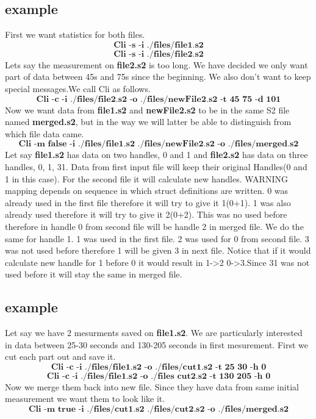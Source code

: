 \documentclass[english]{article}
\begin{document}
\subsection{example}
First we want statistics for both files. $$\textbf{Cli -s -i ./files/file1.s2} $$ $$\textbf{Cli -s -i ./files/file2.s2} $$
Lets say the measurement on \textbf{file2.s2} is too long. We have decided we only want part of data between 45s and 75s since the beginning. We also don't want to keep special messages.We call Cli as follows.
$$ \textbf{Cli -c -i ./files/file2.s2 -o ./files/newFile2.s2 -t 45 75 -d 101}$$
Now we want data from \textbf{file1.s2} and \textbf{newFile2.s2} to be in the same S2 file named \textbf{merged.s2}, but in the way we will latter be able to distinguish from which file data came.
$$ \textbf{Cli -m false -i ./files/file1.s2 ./files/newFile2.s2 -o ./files/merged.s2}$$
Let say \textbf{file1.s2} has data on two handles, 0 and 1 and \textbf{file2.s2} has data on three handles, 0, 1, 31. Data from first input file will keep their original Handles(0 and 1 in this case). For the second file it will calculate new handles. WARNING mapping depends on sequence in which struct definitions are written. 0 was already used in the first file therefore it will try to give it 1(0+1). 1 was also already used therefore it will try to give it 2(0+2). This was no used before therefore in handle 0 from second file will be handle 2 in merged file. We do the same for handle 1. 1 was used in the first file. 2 was used for 0 from second file. 3 was not used before therefore 1 will be given 3 in next file. Notice that if it would calculate new handle for 1 before 0 it would result in 1->2 0->3.Since 31 was not used before it will stay the same in merged file.


\subsection{example}
Let say we have 2 mesurments saved on \textbf{file1.s2}. We are particularly interested in data between 25-30 seconds and 130-205 seconds in first mesurement. First we cut each part out and save it. 
$$ \textbf{Cli -c -i ./files/file1.s2 -o ./files/cut1.s2 -t 25 30 -h 0}    $$
$$ \textbf{Cli -c -i ./files/file1.s2 -o ./files cut2.s2 -t 130 205 -h 0}$$
Now we merge them back into new file. Since they have data from same initial measurement we want them to look like it.
$$ \textbf{Cli -m true -i ./files/cut1.s2 ./files/cut2.s2 -o ./files/merged.s2}$$
\end{document}
